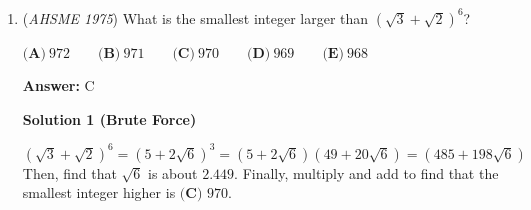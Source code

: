 \begin{enumerate}
\textbf{Solution 2}

Since we only care about a ratio $EG/GF$, and since we are given $M$ being the midpoint of $\overline{BC}$, we realize we can conveniently also choose $E$ to be the midpoint of $\overline{AC}$. (we're free to choose any point $E$ on $\overline{AC}$ as long as $AE$ is twice $AF$, the constraint given in the problem). This means $AE = 16/2 = 8$, and $AF = 4$. We then connect $ME$ which creates similar triangles $\triangle EMC$ and $\triangle ABC$ by SAS, and thus generates parallel lines $\overline{EM}$ and $\overline{AB}$. This also immediately gives us similar triangles $\triangle AFG \sim \triangle MEG, => EG/FG = ME/AF = 6/4 = \boxed{3/2}$ (note that $ME = 6$ because $ME/AB$ is in $1:2$ ratio).

 


 



\textbf{Solution 3}

In order to find $\frac{EG}{FG}$, we can apply the law of sine to this model. Let:

 $\angle MAC=\alpha, \; \angle MAB=\beta, \; \angle AGE=\gamma,\; \angle AMC=\delta$

 Then, in the $\triangle AMC$ and $\triangle AMB$:

 $\frac{MC}{sin\alpha}=\frac{AC}{sin\delta};$$\frac{MB}{sin\beta}=\frac{AB}{sin\delta}=\frac{MC}{sin\alpha}\cdot\frac{3}{4};$$\frac{sin\alpha}{sin\beta}=\frac{3}{4}$

 In the $\triangle AGE$ and $\triangle AGF$:

 $\frac{FG}{sin\beta}=\frac{AF}{sin\gamma};$$\frac{EG}{sin\alpha}=\frac{AE}{sin\gamma};$$\frac{2FG}{sin\beta}=\frac{EG}{sin\alpha};$$\frac{EG}{FG}=\frac{2sin\alpha}{sin\beta}=\frac{3}{2}$

 Hence, our answer is A.

 -VSN

 


	\item (\textit{AHSME 1975}) What is the smallest integer larger than $(\sqrt{3}+\sqrt{2})^6$?


 $\textbf{(A)}\ 972 \qquad \textbf{(B)}\ 971 \qquad \textbf{(C)}\ 970 \qquad \textbf{(D)}\ 969 \qquad \textbf{(E)}\ 968$

 \textbf{Answer: }C



\textbf{Solution 1 (Brute Force)}

$(\sqrt{3}+\sqrt{2})^6=(5+2\sqrt{6})^3=(5+2\sqrt{6})(49+20\sqrt{6})=(485+198\sqrt{6})$ Then, find that $\sqrt{6}$ is about $2.449$. Finally, multiply and add to find that the smallest integer higher is $\boxed {\textbf{(C) } 970}$.


\end{enumerate}
